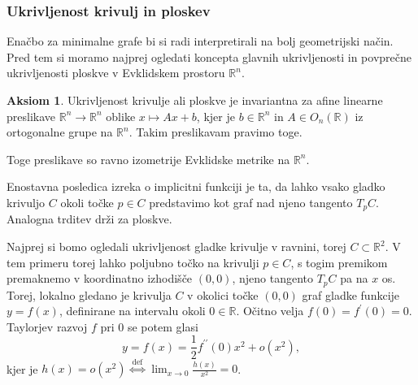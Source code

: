 \documentclass[8pt]{beamer}
\theoremstyle{definition}
\newtheorem{aksiom}{Aksiom}
\theoremstyle{remark}
\theoremstyle{plain}
\numberwithin{equation}{section}  %
\begin{document}
\begin{frame}
    \frametitle{Ukrivljenost krivulj in ploskev}

    Enačbo za minimalne grafe bi si radi interpretirali na bolj geometrijski način. Pred tem si moramo najprej ogledati koncepta glavnih ukrivljenosti in povprečne ukrivljenosti ploskve v Evklidskem prostoru $\mathbb{R}^n$.

    \begin{aksiom}
        Ukrivljenost krivulje ali ploskve je invariantna za afine linearne preslikave $\mathbb{R}^n \rightarrow \mathbb{R}^n$ oblike $x \mapsto A x+b$, kjer je $b \in \mathbb{R}^n$ in $A \in O_n(\mathbb{R})$ iz ortogonalne grupe na $\mathbb{R}^n$. Takim preslikavam pravimo \textcolor{red1}{toge}.
    \end{aksiom}
    Toge preslikave so ravno izometrije Evklidske metrike na $\mathbb{R}^n$. 

    \vspace{0.8em}

    Enostavna posledica izreka o implicitni funkciji je ta, da lahko vsako gladko krivuljo $C$ okoli točke $p \in C$ predstavimo kot graf nad njeno tangento $T_p C$. Analogna trditev drži za ploskve. 
    
    \vspace{0.8em}

    Najprej si bomo ogledali ukrivljenost gladke krivulje v ravnini, torej $C \subset \mathbb{R}^2$. V tem primeru torej lahko poljubno točko na krivulji $p \in C$, s togim premikom premaknemo v koordinatno izhodišče $(0,0)$, njeno tangento $T_p C$ pa na $x$ os. Torej, lokalno gledano je krivulja $C$ v okolici točke $(0,0)$ graf gladke funkcije $y=f(x)$, definirane na intervalu okoli $0 \in \mathbb{R}$. Očitno velja $f(0)=f^{\prime}(0)=0$. Taylorjev razvoj $f$ pri $0$ se potem glasi
    \begin{equation*}
        y=f(x)=\frac{1}{2} f^{\prime \prime}(0) x^2+o\left(x^2\right),
    \end{equation*}
    kjer je $h(x)=o\left(x^2\right) \stackrel{\text { def }}{\iff} \lim _{x \rightarrow 0} \frac{h(x)}{x^2}=0$.

\end{frame}
\end{document}
